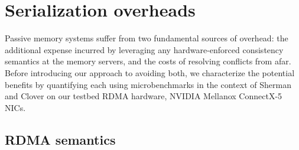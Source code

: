 \section{Serialization overheads}




Passive memory systems suffer from two fundamental sources of overhead: the
additional expense incurred by leveraging any hardware-enforced consistency
semantics at the memory servers, and the costs of resolving conflicts from afar.
Before introducing our approach to avoiding both, we characterize the
potential benefits by quantifying each using microbenchmarks in the context of
Sherman and Clover on our testbed RDMA hardware, NVIDIA Mellanox ConnectX-5
NICs.





\subsection{RDMA semantics}

